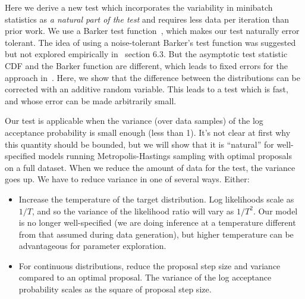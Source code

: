 \documentclass{article}
\begin{document}
Here we derive a new test which incorporates the variability in minibatch
statistics as {\em a natural part of the test} and requires less data per
iteration than prior work. We use a Barker test function~\cite{Barker65}, which
makes our test naturally error tolerant. The idea of using a noise-tolerant
Barker's test function was suggested but not explored empirically
in~\cite{TallData15} section 6.3. But the asymptotic test statistic CDF and the
Barker function are different, which leads to fixed errors for the approach
in~\cite{TallData15}. Here, we show that the difference between the
distributions can be corrected with an additive random variable. This leads to a
test which is fast, and whose error can be made arbitrarily small.

Our test is applicable when the variance (over data samples) of the log
acceptance probability is small enough (less than 1). It's not clear at first why
this quantity should be bounded, but we will show that it is ``natural'' for
well-specified models running Metropolis-Hastings sampling with optimal
proposals~\cite{OptimalScaling01} on a full dataset. When we reduce the amount
of data for the test, the variance goes up. We have to reduce variance in one
of several ways. Either:

\begin{itemize}[noitemsep]
    \item Increase the temperature of the target distribution. Log likelihoods
    scale as $1/T$, and so the variance of the likelihood ratio will vary as
    $1/T^2$. Our model is no longer well-specified (we are doing inference at a
    temperature different from that assumed during data generation), but higher
    temperature can be advantageous for parameter exploration.


    \item For continuous distributions, reduce the proposal step size and
    variance compared to an optimal proposal. The variance of the log acceptance
    probability scales as the square of proposal step size. 

\end{itemize}
\end{document}
